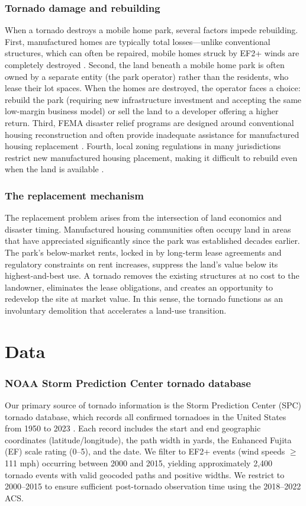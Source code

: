 \documentclass[12pt]{article}
\begin{document}
\subsubsection*{Tornado damage and rebuilding} When a tornado destroys a mobile home park, several factors impede rebuilding. First, manufactured homes are typically total losses---unlike conventional structures, which can often be repaired, mobile homes struck by EF2+ winds are completely destroyed \citep{simmons2013tornado}. Second, the land beneath a mobile home park is often owned by a separate entity (the park operator) rather than the residents, who lease their lot spaces. When the homes are destroyed, the operator faces a choice: rebuild the park (requiring new infrastructure investment and accepting the same low-margin business model) or sell the land to a developer offering a higher return. Third, FEMA disaster relief programs are designed around conventional housing reconstruction and often provide inadequate assistance for manufactured housing replacement \citep{fema2023hmgp}. Fourth, local zoning regulations in many jurisdictions restrict new manufactured housing placement, making it difficult to rebuild even when the land is available \citep{sullivan2018manufactured}.

\subsubsection*{The replacement mechanism} The replacement problem arises from the intersection of land economics and disaster timing. Manufactured housing communities often occupy land in areas that have appreciated significantly since the park was established decades earlier. The park's below-market rents, locked in by long-term lease agreements and regulatory constraints on rent increases, suppress the land's value below its highest-and-best use. A tornado removes the existing structures at no cost to the landowner, eliminates the lease obligations, and creates an opportunity to redevelop the site at market value. In this sense, the tornado functions as an involuntary demolition that accelerates a land-use transition.

\section{Data}
\label{sec:data}

\subsubsection*{NOAA Storm Prediction Center tornado database} Our primary source of tornado information is the Storm Prediction Center (SPC) tornado database, which records all confirmed tornadoes in the United States from 1950 to 2023 \citep{noaaspc2024}. Each record includes the start and end geographic coordinates (latitude/longitude), the path width in yards, the Enhanced Fujita (EF) scale rating (0--5), and the date. We filter to EF2+ events (wind speeds $\geq$ 111 mph) occurring between 2000 and 2015, yielding approximately 2,400 tornado events with valid geocoded paths and positive widths. We restrict to 2000--2015 to ensure sufficient post-tornado observation time using the 2018--2022 ACS.
\end{document}
